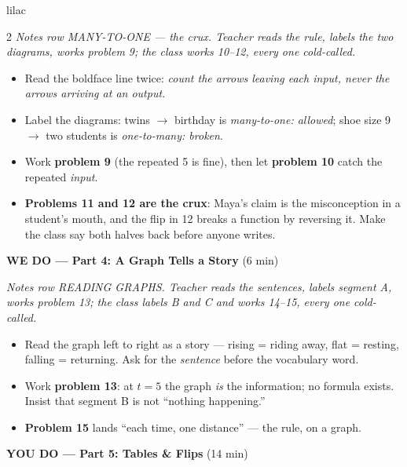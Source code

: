 \documentclass[10pt]{article}
\begin{document}
\begin{skillbox}{lilac}
\begin{multicols}{2}
\textit{Notes row MANY-TO-ONE --- the crux. Teacher reads the rule, labels the two
diagrams, works problem 9; the class works 10--12, every one cold-called.}
\begin{itemize}
  \item Read the boldface line twice: \textit{count the arrows leaving each input,
        never the arrows arriving at an output.}
  \item Label the diagrams: twins $\to$ birthday is \textit{many-to-one: allowed};
        shoe size 9 $\to$ two students is \textit{one-to-many: broken}.
  \item Work \textbf{problem 9} (the repeated 5 is fine), then let
        \textbf{problem 10} catch the repeated \textit{input}.
  \item \textbf{Problems 11 and 12 are the crux}: Maya's claim is the misconception
        in a student's mouth, and the flip in 12 breaks a function by reversing
        it. Make the class say both halves back before anyone writes.
\end{itemize}

\columnbreak

\textbf{WE DO --- Part 4: A Graph Tells a Story} (6 min)

\textit{Notes row READING GRAPHS. Teacher reads the sentences, labels segment A,
works problem 13; the class labels B and C and works 14--15, every one
cold-called.}
\begin{itemize}
  \item Read the graph left to right as a story --- rising = riding away, flat =
        resting, falling = returning. Ask for the \textit{sentence} before the
        vocabulary word.
  \item Work \textbf{problem 13}: at $t = 5$ the graph \textit{is} the
        information; no formula exists. Insist that segment B is not ``nothing
        happening.''
  \item \textbf{Problem 15} lands ``each time, one distance'' --- the rule, on a
        graph.
\end{itemize}

\textbf{YOU DO --- Part 5: Tables \& Flips} (14 min)


\end{multicols}
\end{skillbox}
\end{document}
